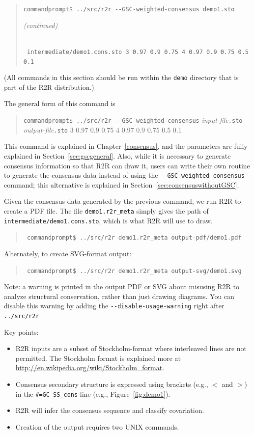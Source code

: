 \documentclass[letterpaper,12pt]{report}
\newcommand{\example}[1]{
\begin{quote}
{\raggedright
#1
}
\end{quote}
}
\newcommand{\examplett}[1]{
\example{{\tt #1}}
}
\begin{document}
\example{
{\tt commandprompt\$ ../src/r2r -{}-GSC-weighted-consensus demo1.sto}\hfill\begin{small}{\it (continued)}\end{small}\\
{\tt\hspace{0.3in} intermediate/demo1.cons.sto 3 0.97 0.9 0.75 4 0.97 0.9 0.75 0.5 0.1}
}
(All commands in this section should be run within the {\tt demo} directory that is part of the
R2R distribution.)

The general form of this command is
\example{
{\tt commandprompt\$ ../src/r2r -{}-GSC-weighted-consensus} {\it input-file}{\tt .sto}\\
\hspace{0.5in} {\it output-file}{\tt .sto} 3 0.97 0.9 0.75 4 0.97 0.9 0.75 0.5 0.1
}
This command is explained in Chapter~\ref{consensus}, and the parameters are fully explained in
Section~\ref{sec:gscgeneral}.
Also, while it is necessary to generate consensus information so that R2R can draw it,
users can write their own routine to generate the consensus data instead of using
the {\tt -{}-GSC-weighted-consensus} command; this alternative is
explained in Section~\ref{sec:consensuswithoutGSC}.

Given the consensus data generated by the previous command, we run R2R to create a PDF file.  The file {\tt demo1.r2r\_meta} simply
gives the path of {\tt intermediate/demo1.cons.sto}, which is what R2R will use to draw.

\examplett{
commandprompt\$ ../src/r2r demo1.r2r\_meta output-pdf/demo1.pdf
}

Alternately, to create SVG-format output:
\examplett{
commandprompt\$ ../src/r2r demo1.r2r\_meta output-svg/demo1.svg
}

Note: a warning is printed in the output PDF or SVG about misusing R2R to analyze structural conservation, rather than just drawing diagrams.  You can disable this warning by adding the {\tt -{}-disable-usage-warning} right after {\tt ../src/r2r}

Key points:
\begin{itemize}
\item R2R inputs are a subset of Stockholm-format where interleaved lines are not permitted.  The Stockholm format is explained more at \url{http://en.wikipedia.org/wiki/Stockholm_format}.
\item Consensus secondary structure is expressed using brackets (e.g., $<$ and $>$) in the {\tt \#=GC SS\_cons} line (e.g., Figure~\ref{fig:demo1}).
\item R2R will infer the consensus sequence and classify covariation.
\item Creation of the output requires two UNIX commands.
\end{itemize}
\end{document}
